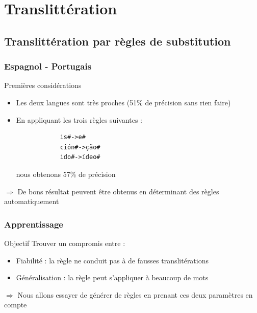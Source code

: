 \documentclass{beamer}
\begin{document}
\section{Translittération}


\begin{frame}
\tableofcontents[currentsection]
\end{frame}



\subsection{Translittération par règles de substitution}


\begin{frame}[fragile]
	\frametitle{Espagnol - Portugais}

	\begin{block}{Premières considérations}
		\begin{itemize}
		\item Les deux langues sont très proches (51\% de précision sans rien faire)
		\item En appliquant les trois règles suivantes : {\scriptsize \begin{verbatim}
			is#->e#
			ción#->ção#
			ido#->ídeo#
			\end{verbatim}}
			nous obtenons 57\% de précision
		\end{itemize}
	\end{block}

	\begin{alertblock}{}
	$\Longrightarrow$ De bons résultat peuvent être obtenus en déterminant des règles automatiquement 
	\end{alertblock}
\end{frame}

\begin{frame}
	\frametitle{Apprentissage}

	\begin{block}{Objectif}
	Trouver un compromis entre :
		\begin{itemize}
		\item Fiabilité : la règle ne conduit pas à de fausses translitérations
		\item Généralisation : la règle peut s'appliquer à beaucoup de mots
		\end{itemize}			
	\end{block}

	\begin{alertblock}{}
	$\Longrightarrow$ Nous allons essayer de générer de règles en prenant ces deux paramètres en compte
	\end{alertblock}
\end{frame}
\end{document}
